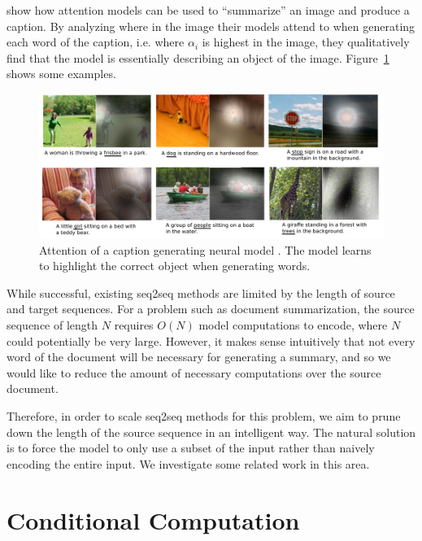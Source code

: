 \documentclass[12pt]{report}
\begin{document}
\citet{xu2015captioning} show how attention models can be used to ``summarize'' an image and produce a caption. 
By analyzing where in the image their models attend to when generating each word of the caption, i.e. where $\alpha_i$ is highest in the image, they qualitatively find that the model is essentially describing an object of the image. 
Figure~\ref{fig:caption} shows some examples.

\begin{figure}[t]
\centering
\includegraphics[width=\textwidth]{images/xucaption}
\caption{Attention of a caption generating neural model \citep{xu2015captioning}. The model learns to highlight the correct object when generating words.}
\label{fig:caption}
\end{figure}


While successful, existing seq2seq methods are limited by the length of source and target sequences. For a problem such as document summarization, the source sequence of length $N$ requires $O(N)$ model computations to encode, where $N$ could potentially be very large. However, it makes sense intuitively that not every word of the document will be necessary for generating a summary, and so we would like to reduce the amount of necessary computations over the source document.

Therefore, in order to scale seq2seq methods for this problem, we aim to prune down the length of the source sequence in an intelligent way. The natural solution is to force the model to only use a subset of the input rather than naively encoding the entire input. We investigate some related work in this area.


\section{Conditional Computation}


\end{document}

